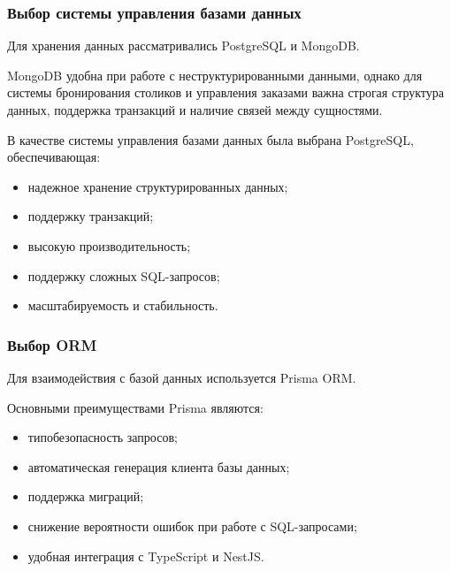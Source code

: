 \subsubsection{Выбор системы управления базами данных}

Для хранения данных рассматривались PostgreSQL и MongoDB.

MongoDB удобна при работе с неструктурированными данными, однако для системы бронирования столиков и управления заказами важна строгая структура данных, поддержка транзакций и наличие связей между сущностями.

В качестве системы управления базами данных была выбрана PostgreSQL, обеспечивающая:

\begin{itemize}
\item надежное хранение структурированных данных;

\item поддержку транзакций;

\item высокую производительность;

\item поддержку сложных SQL-запросов;

\item масштабируемость и стабильность.

\end{itemize}

\subsubsection{Выбор ORM}

Для взаимодействия с базой данных используется Prisma ORM.

Основными преимуществами Prisma являются:

\begin{itemize}
\item типобезопасность запросов;

\item автоматическая генерация клиента базы данных;

\item поддержка миграций;

\item снижение вероятности ошибок при работе с SQL-запросами;

\item удобная интеграция с TypeScript и NestJS.
\end{itemize}

